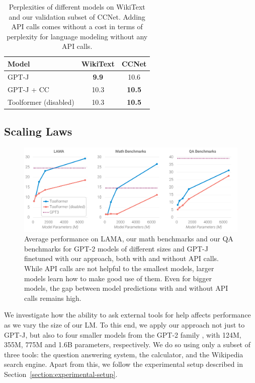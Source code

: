 \documentclass[11pt]{article}
\newcommand{\ours}[0]{Toolformer}
\begin{document}
\begin{CJK*}{UTF8}{gbsn}
\begin{table}
    \centering
    \small
    \begin{tabularx}{\linewidth}{Xcc}
        \toprule
        \textbf{Model} & \textbf{WikiText} & \textbf{CCNet} \\
        \midrule
         GPT-J & \textbf{\phantom{0}9.9} & 10.6 \\         
         GPT-J + CC & 10.3 & \textbf{10.5} \\        
         \ours{} (disabled) & 10.3 & \textbf{10.5} \\
         \bottomrule
    \end{tabularx}
    \caption{Perplexities of different models on WikiText and our validation subset of CCNet. Adding API calls comes without a cost in terms of perplexity for language modeling without any API calls.}
    \label{tab:perplexities}
\end{table}

\subsection{Scaling Laws}
\label{section:scaling-laws}

\begin{figure}
    \centering
    \includegraphics[width=\linewidth]{figures/scaling_laws.pdf}
    \caption{Average performance on LAMA, our math benchmarks and our QA benchmarks for GPT-2 models of different sizes and GPT-J finetuned with our approach, both with and without API calls. While API calls are not helpful to the smallest models, larger models learn how to make good use of them. Even for bigger models, the gap between model predictions with and without API calls remains high.}
    \label{fig:scaling_laws}
\end{figure}

We investigate how the ability to ask external tools for help affects performance as we vary the size of our LM. To this end, we apply our approach not just to GPT-J, but also to four smaller models from the GPT-2 family \citep{radford2019language}, with 124M, 355M, 775M and 1.6B parameters, respectively. We do so using only a subset of three tools: the question answering system, the calculator, and the Wikipedia search engine. Apart from this, we follow the experimental setup described in Section~\ref{section:experimental-setup}.


\end{CJK*}
\end{document}
